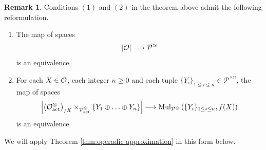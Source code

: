 \documentclass[10pt, reqno, twoside
, final
]{amsart}
\numberwithin{equation}{subsection}%
\theoremstyle{definition}
\theoremstyle{definition}
\theoremstyle{definition}
\theoremstyle{definition}
\theoremstyle{definition}
\theoremstyle{definition}
\theoremstyle{definition}
\theoremstyle{definition}
\theoremstyle{definition}
\theoremstyle{plain}
\theoremstyle{definition}
\theoremstyle{plain}
\theoremstyle{definition}
\theoremstyle{plain}
\theoremstyle{definition}
\newtheorem{rmk}[defn]{Remark}
\theoremstyle{definition}
\theoremstyle{plain}
\theoremstyle{plain}
\theoremstyle{definition}
\theoremstyle{plain}
\theoremstyle{plain}
\theoremstyle{plain}
\begin{document}
\begin{rmk}
Conditions $(1)$ and $(2)$ in the theorem above admit the following reformulation.
\begin{enumerate}[$(1')$]
    \item The map of spaces 
    \[ |\mathcal{O}|\longrightarrow \mathcal{P}^{\simeq}  \]
    is an equivalence.
    \item For each $X\in \mathcal{O}$, each integer $n\geq 0$ and each tuple $\{Y_i\}_{1\leq i\leq n}\in \mathcal{P}^{\times n}$, the map of spaces 
    \[ \left|\left(\mathcal{O}^{\otimes}_{\mathrm{act}}\right)_{/X}\times_{\mathcal{P}^{\otimes}_{\mathrm{act}}} \left\{ Y_1\oplus \ldots \oplus Y_n \right\} \right| \longrightarrow \mathrm{Mul}_{\mathcal{P}^{\otimes}}\left(\{Y_i\}_{1\leq i\leq n},f(X)\right )  \]
    is an equivalence.
\end{enumerate}
We will apply Theorem \ref{thm:operadic approximation} in this form below.
\end{rmk}
\end{document}
